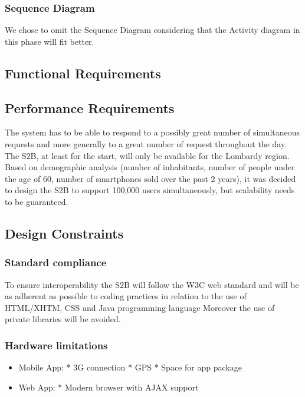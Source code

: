 		


\subsubsection{Sequence Diagram}
We chose to omit the Sequence Diagram considering that the Activity diagram in this phase will fit better.
\subsection{Functional Requirements}
\subsection{Performance Requirements}
The system has to be able to respond to a possibly great number of simultaneous requests and
more generally to a great number of request throughout the day.
The S2B, at least for the start, will only be available for the Lombardy region. Based on demographic analysis (number of inhabitants, number of people under the age of 60, number of smartphones sold over the past 2 years), it was decided to design the S2B to support 100,000 users simultaneously, but scalability needs to be guaranteed.
\subsection{Design Constraints}
	\subsubsection{Standard compliance}
	To ensure interoperability the S2B will follow the W3C web standard and will be as adherent as possible to  coding practices in relation to the use of HTML/XHTM, CSS and Java programming language
	Moreover the use of private libraries will be avoided.
	\subsubsection{Hardware limitations}
		\begin{itemize}
		\item Mobile App: \newline
		* 3G connection\newline
		* GPS\newline
		* Space for app package
		\item Web App:\newline
		* Modern browser with AJAX support
		\end{itemize}
	
